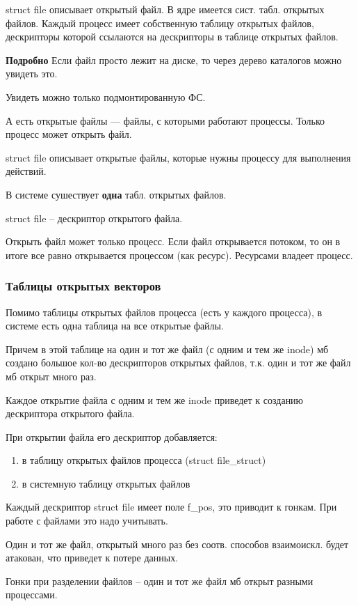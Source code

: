 struct file описывает открытый файл. В ядре имеется сист. табл. открытых файлов. Каждый процесс имеет собственную таблицу открытых файлов, дескрипторы которой ссылаются на дескрипторы в таблице открытых файлов.

\textbf{Подробно}
Если файл просто лежит на диске, то через дерево каталогов можно увидеть это. 

Увидеть можно только подмонтированную ФС.

А есть открытые файлы --- файлы, с которыми работают процессы. Только процесс может открыть файл.

struct file описывает открытые файлы, которые нужны процессу для выполнения действий.

В системе сушествует \textbf{одна} табл. открытых файлов.

struct file -- дескриптор открытого файла.

Открыть файл может только процесс. Если файл открывается потоком, то он в итоге все равно открывается процессом (как ресурс). Ресурсами владеет процесс.


\subsubsection{Таблицы открытых векторов}

Помимо таблицы открытых файлов процесса (есть у каждого процесса), в системе есть одна таблица на все открытые файлы.

Причем в этой таблице на один и тот же файл (с одним и тем же inode) мб создано большое кол-во дескрипторов открытых файлов, т.к. один и тот же файл мб открыт много раз. 

Каждое открытие файла с одним и тем же inode приведет к созданию дескриптора открытого файла.

При открытии файла его дескриптор добавляется:
\begin{enumerate}
    \item в таблицу открытых файлов процесса (struct file\_struct)
    \item в системную таблицу открытых файлов
\end{enumerate}

Каждый дескриптор struct file имеет поле f\_pos, это приводит к гонкам. При работе с файлами это надо учитывать.

Один и тот же файл, открытый много раз без соотв. способов взаимоискл. будет атакован, что приведет к потере данных.

Гонки при разделении файлов -- один и тот же файл мб открыт разными процессами.

